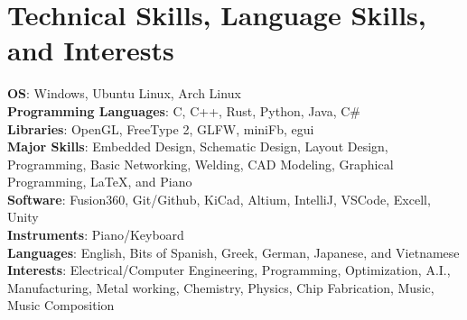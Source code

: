 \documentclass[letterpaper,10pt]{article}
\begin{document}
\section{Technical Skills, Language Skills, and Interests}
 \begin{itemize}[leftmargin=0.15in, label={}]
    \small{\item{
    \textbf{OS}{: Windows, Ubuntu Linux, Arch Linux} \\
     \textbf{Programming Languages}{: C, C++, Rust, Python, Java, C\#} \\
     \textbf{Libraries}{: OpenGL, FreeType 2, GLFW, miniFb, egui }\\
     \textbf{Major Skills}{: Embedded Design, Schematic Design, Layout Design, Programming, Basic Networking, Welding, CAD Modeling, Graphical Programming, LaTeX, and Piano }\\
     \textbf{Software}{: Fusion360, Git/Github, KiCad, Altium, IntelliJ, VSCode, Excell, Unity } \\
     \textbf{Instruments}{: Piano/Keyboard }\\
     \textbf{Languages}{: English, Bits of Spanish, Greek, German, Japanese, and Vietnamese } \\
     \textbf{Interests}{: Electrical/Computer Engineering, Programming, Optimization, A.I., Manufacturing, Metal working, Chemistry, Physics, Chip Fabrication, Music, Music Composition }
     
    }}
 \end{itemize}
\end{document}
